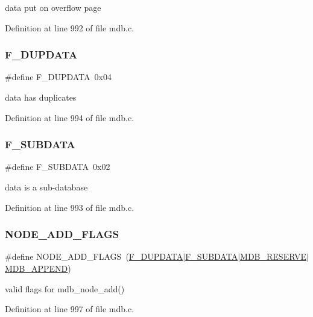 data put on overflow page 

Definition at line 992 of file mdb.\+c.

\mbox{\label{group__mdb__node_ga6e93fc5b62c03a0b85d0755b7d19bee5}} 
\subsubsection{\texorpdfstring{F\+\_\+\+D\+U\+P\+D\+A\+TA}{F\_DUPDATA}}
{\footnotesize\ttfamily \#define F\+\_\+\+D\+U\+P\+D\+A\+TA~0x04}

data has duplicates 

Definition at line 994 of file mdb.\+c.

\mbox{\label{group__mdb__node_ga5323896692f7418870f72d7a5f1b2bab}} 
\subsubsection{\texorpdfstring{F\+\_\+\+S\+U\+B\+D\+A\+TA}{F\_SUBDATA}}
{\footnotesize\ttfamily \#define F\+\_\+\+S\+U\+B\+D\+A\+TA~0x02}

data is a sub-\/database 

Definition at line 993 of file mdb.\+c.

\mbox{\label{group__mdb__node_ga8dbbb28473b39ed9d19dc4e7b5b4dd52}} 
\subsubsection{\texorpdfstring{N\+O\+D\+E\+\_\+\+A\+D\+D\+\_\+\+F\+L\+A\+GS}{NODE\_ADD\_FLAGS}}
{\footnotesize\ttfamily \#define N\+O\+D\+E\+\_\+\+A\+D\+D\+\_\+\+F\+L\+A\+GS~(\mbox{\hyperlink{group__mdb__node_ga6e93fc5b62c03a0b85d0755b7d19bee5}{F\+\_\+\+D\+U\+P\+D\+A\+TA}}$\vert$\mbox{\hyperlink{group__mdb__node_ga5323896692f7418870f72d7a5f1b2bab}{F\+\_\+\+S\+U\+B\+D\+A\+TA}}$\vert$\mbox{\hyperlink{group__mdb__put_gac0545c6aea719991e3eae6ccc686efcc}{M\+D\+B\+\_\+\+R\+E\+S\+E\+R\+VE}}$\vert$\mbox{\hyperlink{group__mdb__put_ga06af7a6e87588fd723e2dd1d7e580e6a}{M\+D\+B\+\_\+\+A\+P\+P\+E\+ND}})}

valid flags for mdb\+\_\+node\+\_\+add() 

Definition at line 997 of file mdb.\+c.

